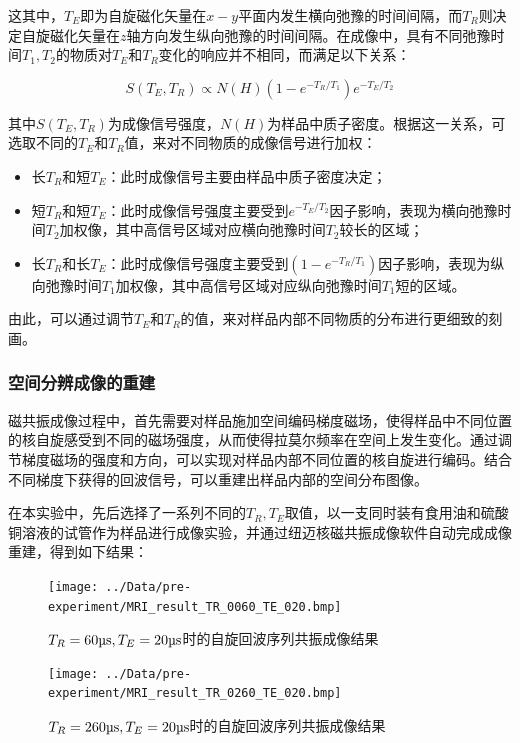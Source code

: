 \documentclass{thuemp}
\begin{document}
这其中，$T_E$即为自旋磁化矢量在$x-y$平面内发生横向弛豫的时间间隔，而$T_R$则决定自旋磁化矢量在$z$轴方向发生纵向弛豫的时间间隔。在成像中，具有不同弛豫时间$T_1,T_2$的物质对$T_E$和$T_R$变化的响应并不相同，而满足以下关系：

\begin{equation}
    S(T_E, T_R) \propto N(H) \left(1 - e^{-T_R/T_1}\right)e^{-T_E/T_2}
\end{equation}

其中$S(T_E, T_R)$为成像信号强度，$N(H)$为样品中质子密度。根据这一关系，可选取不同的$T_E$和$T_R$值，来对不同物质的成像信号进行加权：

\begin{itemize}
    \item 长$T_R$和短$T_E$：此时成像信号主要由样品中质子密度决定；
    \item 短$T_R$和短$T_E$：此时成像信号强度主要受到$e^{-T_E/T_2}$因子影响，表现为横向弛豫时间$T_2$加权像，其中高信号区域对应横向弛豫时间$T_2$较长的区域；
    \item 长$T_R$和长$T_E$：此时成像信号强度主要受到$(1-e^{-T_R/T_1})$因子影响，表现为纵向弛豫时间$T_1$加权像，其中高信号区域对应纵向弛豫时间$T_1$短的区域。
\end{itemize}

由此，可以通过调节$T_E$和$T_R$的值，来对样品内部不同物质的分布进行更细致的刻画。

\subsubsection{空间分辨成像的重建}

磁共振成像过程中，首先需要对样品施加空间编码梯度磁场，使得样品中不同位置的核自旋感受到不同的磁场强度，从而使得拉莫尔频率在空间上发生变化。通过调节梯度磁场的强度和方向，可以实现对样品内部不同位置的核自旋进行编码。结合不同梯度下获得的回波信号，可以重建出样品内部的空间分布图像。

在本实验中，先后选择了一系列不同的$T_R, T_E$取值，以一支同时装有食用油和硫酸铜溶液的试管作为样品进行成像实验，并通过纽迈核磁共振成像软件自动完成成像重建，得到如下结果：

\begin{figure}[H]
    \centering
    \texttt{[image: ../Data/pre-experiment/MRI\_result\_TR\_0060\_TE\_020.bmp]}
    \caption{$T_R = \text{\si{60 \micro\second}}, T_E = \text{\si{20 \micro\second}}$时的自旋回波序列共振成像结果}
    \label{fig:mri_0060_020}
\end{figure}

\begin{figure}[H]
    \centering
    \texttt{[image: ../Data/pre-experiment/MRI\_result\_TR\_0260\_TE\_020.bmp]}
    \caption{$T_R = \text{\si{260 \micro\second}}, T_E = \text{\si{20 \micro\second}}$时的自旋回波序列共振成像结果}
    \label{fig:mri_0260_020}
\end{figure}
\end{document}
